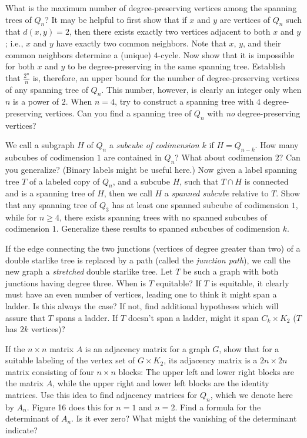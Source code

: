 \documentclass{article}
\begin{document}
\begin{description}
  What is the maximum number of degree-preserving vertices among the spanning trees of $Q_n$? It may be helpful to first show that if $x$ and $y$ are vertices of $Q_n$ such that $d(x,y)=2$, then there exists exactly two vertices adjacent to both $x$ and $y$; i.e., $x$ and $y$ have exactly two common neighbors. Note that $x$, $y$, and their common neighbors determine a (unique) $4$-cycle. Now show that it is impossible for both $x$ and $y$ to be degree-preserving in the same spanning tree. Establish that $\frac{2^n}{n}$ is, therefore, an upper bound for the number of degree-preserving vertices of any spanning tree of $Q_n$. This number, however, is clearly an integer only when $n$ is a power of $2$. When $n = 4$, try to construct a spanning tree with $4$ degree-preserving vertices. Can you find a spanning tree of $Q_n$ with \emph{no} degree-preserving vertices?

\item[25.] We call a subgraph $H$ of $Q_n$ a \emph{subcube of codimension $k$} if $H = Q_{n-k}$. How many subcubes of codimension $1$ are contained in $Q_n$? What about codimension $2$? Can you generalize? (Binary labels might be useful here.) Now given a label spanning tree $T$ of a labeled copy of $Q_n$, and a subcube $H$, such that $T \cap H$ is connected and is a spanning tree of $H$, then we call $H$ a \emph{spanned subcube} relative to $T$. Show that any spanning tree of $Q_3$ has at least one spanned subcube of codimension $1$, while for $n \geq 4$, there exists spanning trees with no spanned subcubes of codimension $1$. Generalize these results to spanned subcubes of codimension $k$.

\item[26.] If the edge connecting the two junctions (vertices of degree greater than two) of a double starlike tree is replaced by a path (called the \emph{junction path}), we call the new graph a \emph{stretched} double starlike tree. Let $T$ be such a graph with both junctions having degree three. When is $T$ equitable? If $T$ is equitable, it clearly must have an even number of vertices, leading one to think it might span a ladder. Is this always the case? If not, find additional hypotheses which will assure that $T$ spans a ladder. If $T$ doesn't span a ladder, might it span $C_k \times K_2$ ($T$ has $2k$ vertices)?

\item[27.] If the $n \times n$ matrix $A$ is an adjacency matrix for a graph $G$, show that for a suitable labeling of the vertex set of $G \times K_2$, its adjacency matrix is a $2n \times 2n$ matrix consisting of four $n \times n$ blocks: The upper left and lower right blocks are the matrix $A$, while the upper right and lower left blocks are the identity matrices. Use this idea to find adjacency matrices for $Q_n$, which we denote here by $A_n$. Figure 16 does this for $n = 1$ and $n = 2$. Find a formula for the determinant of $A_n$. Is it ever zero? What might the vanishing of the determinant indicate?


\end{description}
\end{document}
